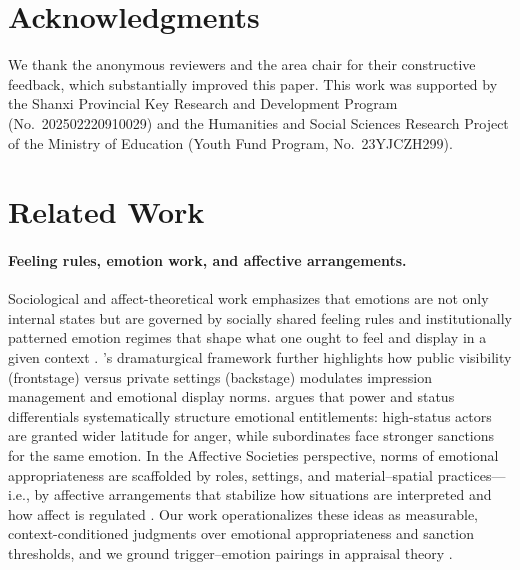 \documentclass[11pt]{article}
\begin{document}
\section*{Acknowledgments}
We thank the anonymous reviewers and the area chair for their constructive feedback, which substantially improved this paper. This work was supported by the Shanxi Provincial Key Research and Development Program (No.~202502220910029) and the Humanities and Social Sciences Research Project of the Ministry of Education (Youth Fund Program, No.~23YJCZH299).

%


\appendix


\section{Related Work}
\paragraph{Feeling rules, emotion work, and affective arrangements.}
Sociological and affect-theoretical work emphasizes that emotions are not only internal states but are governed by socially shared feeling rules and institutionally patterned emotion regimes that shape what one ought to feel and display in a given context \cite{hochschild1979emotionwork,russell2012managed,reddy2001navigationoffeeling,cummins2024feelingtherules}.
\citet{goffman2023presentation}'s dramaturgical framework further highlights how public visibility (frontstage) versus private settings (backstage) modulates impression management and emotional display norms.
\citet{kemper1978socialinteractional} argues that power and status differentials systematically structure emotional entitlements: high-status actors are granted wider latitude for anger, while subordinates face stronger sanctions for the same emotion.
In the Affective Societies perspective, norms of emotional appropriateness are scaffolded by roles, settings, and material--spatial practices---i.e., by affective arrangements that stabilize how situations are interpreted and how affect is regulated \cite{slaby2019affectivesocieties,slaby2019affectivearrangements,vonscheve2012emotionregulation}.
Our work operationalizes these ideas as measurable, context-conditioned judgments over emotional appropriateness and sanction thresholds, and we ground trigger--emotion pairings in appraisal theory \cite{lazarus1991emotionadaptation,scherer2005appraisalprocesses}.
\end{document}
